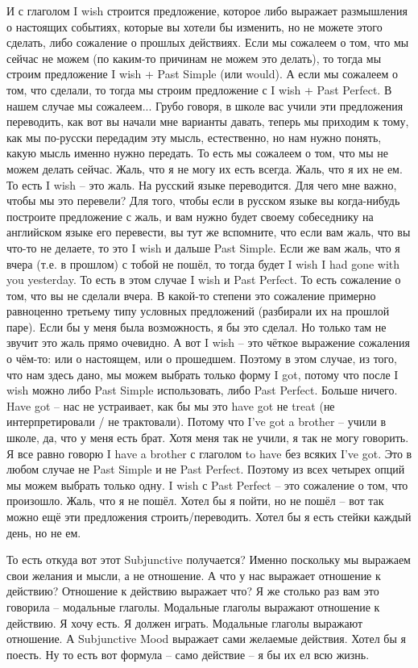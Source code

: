 \documentclass[main.tex]{subfiles}
\begin{document}
И с глаголом I wish строится предложение, которое либо выражает размышления о настоящих событиях, которые вы хотели бы изменить, но не можете этого сделать, либо сожаление о прошлых действиях.
Если мы сожалеем о том, что мы сейчас не можем (по каким-то причинам не можем это делать), то тогда мы строим предложение I wish + Past Simple (или would).
А если мы сожалеем о том, что сделали, то тогда мы строим предложение с I wish + Past Perfect.
В нашем случае мы сожалеем...
Грубо говоря, в школе вас учили эти предложения переводить, как вот вы начали мне варианты давать, теперь мы приходим к тому, как мы по-русски передадим эту мысль, естественно, но нам нужно понять, какую мысль именно нужно передать.
То есть мы сожалеем о том, что мы не можем делать сейчас.
Жаль, что я не могу их есть всегда.
Жаль, что я их не ем.
То есть I wish -- это жаль.
На русский языке переводится.
Для чего мне важно, чтобы мы это перевели?
Для того, чтобы если в русском языке вы когда-нибудь построите предложение с жаль, и вам нужно будет своему собеседнику на английском языке его перевести, вы тут же вспомните, что если вам жаль, что вы что-то не делаете, то это I wish и дальше Past Simple.
Если же вам жаль, что я вчера (т.е. в прошлом) с тобой не пошёл, то тогда будет I wish I had gone with you yesterday.
То есть в этом случае I wish и Past Perfect.
То есть сожаление о том, что вы не сделали вчера.
В какой-то степени это сожаление примерно равноценно третьему типу условных предложений (разбирали их на прошлой паре).
Если бы у меня была возможность, я бы это сделал.
Но только там не звучит это жаль прямо очевидно.
А вот I wish -- это чёткое выражение сожаления о чём-то: или о настоящем, или о прошедшем.
Поэтому в этом случае, из того, что нам здесь дано, мы можем выбрать только форму I got, потому что после I wish можно либо Past Simple использовать, либо Past Perfect.
Больше ничего.
Have got -- нас не устраивает, как бы мы это have got не treat (не интерпретировали / не трактовали).
Потому что I've got a brother -- учили в школе, да, что у меня есть брат.
Хотя меня так не учили, я так не могу говорить.
Я все равно говорю I have a brother с глаголом to have без всяких I've got.
Это в любом случае не Past Simple и не Past Perfect.
Поэтому из всех четырех опций мы можем выбрать только одну.
I wish с Past Perfect -- это сожаление о том, что произошло.
Жаль, что я не пошёл.
Хотел бы я пойти, но не пошёл -- вот так можно ещё эти предложения строить/переводить.
Хотел бы я есть стейки каждый день, но не ем.

То есть откуда вот этот Subjunctive получается?
Именно поскольку мы выражаем свои желания и мысли, а не отношение.
А что у нас выражает отношение к действию?
Отношение к действию выражает что?
Я же столько раз вам это говорила -- модальные глаголы.
Модальные глаголы выражают отношение к действию.
Я хочу есть.
Я должен играть.
Модальные глаголы выражают отношение.
А Subjunctive Mood выражает сами желаемые действия.
Хотел бы я поесть.
Ну то есть вот формула -- само действие -- я бы их ел всю жизнь.
\end{document}
